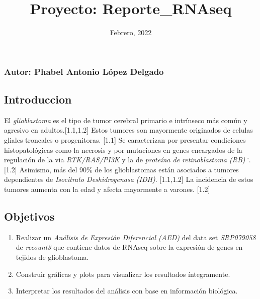 \documentclass[
]{article}
\title{Proyecto: Reporte\_RNAseq}
\author{}
\date{\vspace{-2.5em}Febrero, 2022}
\newenvironment{Shaded}{\begin{snugshade}}{\end{snugshade}}
\newcommand{\AttributeTok}[1]{\textcolor[rgb]{0.77,0.63,0.00}{#1}}
\newcommand{\ConstantTok}[1]{\textcolor[rgb]{0.00,0.00,0.00}{#1}}
\newcommand{\FunctionTok}[1]{\textcolor[rgb]{0.00,0.00,0.00}{#1}}
\newcommand{\NormalTok}[1]{#1}
\newcommand{\SpecialCharTok}[1]{\textcolor[rgb]{0.00,0.00,0.00}{#1}}
\providecommand{\tightlist}{%
  \setlength{\itemsep}{0pt}\setlength{\parskip}{0pt}}
\begin{document}
\maketitle

\hypertarget{autor-phabel-antonio-luxf3pez-delgado}{%
\subsubsection{Autor: Phabel Antonio López
Delgado}\label{autor-phabel-antonio-luxf3pez-delgado}}

\begin{Shaded}
\end{Shaded}

\hypertarget{introduccion}{%
\subsection{Introduccion}\label{introduccion}}

El \emph{glioblastoma} es el tipo de tumor cerebral primario e
intrínseco más común y agresivo en adultos.{[}1.1,1.2{]} Estos tumores
son mayormente originados de celulas gliales troncales o progenitoras.
{[}1.1{]} Se caracterizan por presentar condiciones histopatológicas
como la necrosis y por mutaciones en genes encargados de la regulación
de la via \emph{RTK/RAS/PI3K} y la de \emph{proteína de retinoblastoma
(RB)¨}. {[}1.2{]} Asimismo, más del 90\% de los glioblastomas están
asociados a tumores dependientes de \emph{Isocitrato Deshidrogenasa
(IDH)}. {[}1.1,1.2{]} La incidencia de estos tumores aumenta con la edad
y afecta mayormente a varones. {[}1.2{]}

\hypertarget{objetivos}{%
\subsection{Objetivos}\label{objetivos}}

\begin{enumerate}
\def\labelenumi{\arabic{enumi})}
\tightlist
\item
  Realizar un \emph{Análisis de Expresión Diferencial (AED)} del data
  set \emph{SRP079058} de \emph{recount3} que contiene datos de RNAseq
  sobre la expresión de genes en tejidos de glioblastoma.
\item
  Construir gráficas y plots para visualizar los resultados
  íntegramente.
\item
  Interpretar los resultados del análisis con base en información
  biológica.
\end{enumerate}
\end{document}
